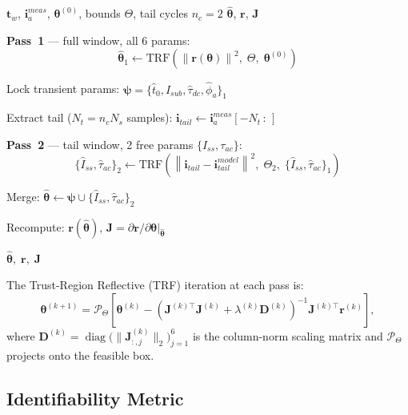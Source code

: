 \documentclass[journal, twoside, 10pt]{IEEEtran}
\newcommand{\vect}[1]{\bm{#1}}
\newcommand{\mat}[1]{\mathbf{#1}}
\newcommand{\norm}[1]{\left\|#1\right\|}
\newcommand{\diag}{\operatorname{diag}}
\begin{document}
\begin{algorithm}[t]
\caption{Two-Pass Phase-A Estimator}
\label{alg:twopass}
\begin{algorithmic}[1]
\Require $\vect{t}_w$, $\vect{i}_a^{meas}$, $\vect{\theta}^{(0)}$, bounds $\Theta$,
         tail cycles $n_c = 2$
\Ensure $\hat{\vect{\theta}}$, $\vect{r}$, $\mat{J}$

\State \textbf{Pass~1} — full window, all 6 params:
\[
  \hat{\vect{\theta}}_1 \leftarrow
  \mathrm{TRF}\!\left(\norm{\vect{r}(\vect{\theta})}^2,\;\Theta,\;\vect{\theta}^{(0)}\right)
\]

\State Lock transient params:
       $\vect{\psi} = \{\hat{t}_0, \hat{I}_{sub}, \hat{\tau}_{dc}, \hat{\phi}_a\}_1$

\State Extract tail ($N_t = n_c N_s$ samples):
       $\vect{i}_{tail} \leftarrow \vect{i}_a^{meas}[-N_t\,{:}\,]$

\State \textbf{Pass~2} — tail window, 2 free params $\{I_{ss},\tau_{ac}\}$:
\[
  \{\hat{I}_{ss},\hat{\tau}_{ac}\}_2 \leftarrow
  \mathrm{TRF}\!\left(\norm{\vect{i}_{tail} - \vect{i}_{tail}^{model}}^2,\;
  \Theta_{2},\;\{\hat{I}_{ss},\hat{\tau}_{ac}\}_1\right)
\]

\State Merge: $\hat{\vect{\theta}} \leftarrow \vect{\psi} \cup
       \{\hat{I}_{ss},\hat{\tau}_{ac}\}_2$

\State Recompute: $\vect{r}(\hat{\vect{\theta}})$,
       $\mat{J} = \partial\vect{r}/\partial\vect{\theta}|_{\hat{\vect{\theta}}}$

\Return $\hat{\vect{\theta}},\;\vect{r},\;\mat{J}$
\end{algorithmic}
\end{algorithm}

The Trust-Region Reflective (TRF) iteration at each pass is:
\begin{equation}
  \vect{\theta}^{(k+1)} = \mathcal{P}_\Theta\!\left[
    \vect{\theta}^{(k)} -
    \left(\mat{J}^{(k)\top}\mat{J}^{(k)} + \lambda^{(k)}\mat{D}^{(k)}\right)^{-1}
    \mat{J}^{(k)\top}\vect{r}^{(k)}
  \right],
  \label{eq:trf}
\end{equation}
where $\mat{D}^{(k)} = \diag\!\bigl(\|\mat{J}^{(k)}_{:,j}\|_2\bigr)_{j=1}^{6}$
is the column-norm scaling matrix and $\mathcal{P}_\Theta$ projects onto the
feasible box.

\subsection{Identifiability Metric}
\end{document}
